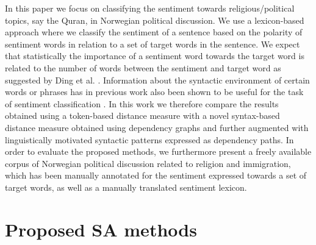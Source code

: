\documentclass[11pt]{article}
\begin{document}
In this paper we focus on classifying the sentiment towards
religious/political topics, say the Quran, in Norwegian political
discussion. We use a lexicon-based approach where we classify the
sentiment of a sentence based on the polarity of sentiment words in
relation to a set of target words in the sentence. We expect that
statistically the importance of a sentiment word towards the target
word is related to the number of words between the sentiment and
target word as suggested by Ding et al. .
Information about the syntactic environment of certain words or
phrases has in previous work also been shown to be useful for the task
of sentiment classification \cite{Wil:Wie:Hof:09,Jiang11}. In this
work we therefore compare the results obtained using a token-based
distance measure with a novel syntax-based distance measure obtained
using dependency graphs and further augmented with linguistically
motivated syntactic patterns expressed as dependency paths. In order
to evaluate the proposed methods, we furthermore present a freely
available corpus of Norwegian political discussion related to religion
and immigration, which has been manually annotated for the sentiment
expressed towards a set of target words, as well as a manually
translated sentiment lexicon.



\section{Proposed SA methods}
\label{sec:om}
\end{document}
